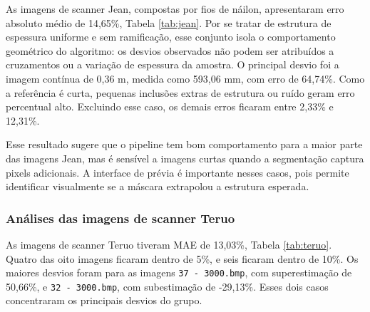 \documentclass[12pt]{article}
\begin{document}
As imagens de scanner Jean, compostas por fios de náilon, apresentaram erro absoluto médio de 14,65\%, Tabela \ref{tab:jean}. Por se tratar de estrutura de espessura uniforme e sem ramificação, esse conjunto isola o comportamento geométrico do algoritmo: os desvios observados não podem ser atribuídos a cruzamentos ou a variação de espessura da amostra. O principal desvio foi a imagem contínua de 0,36 m, medida como 593,06 mm, com erro de 64,74\%. Como a referência é curta, pequenas inclusões extras de estrutura ou ruído geram erro percentual alto. Excluindo esse caso, os demais erros ficaram entre 2,33\% e 12,31\%.

\begin{table}[!htbp]
\centering
\caption{Resultados das imagens Jean.}
\label{tab:jean}
\end{table}

Esse resultado sugere que o pipeline tem bom comportamento para a maior parte das imagens Jean, mas é sensível a imagens curtas quando a segmentação captura pixels adicionais. A interface de prévia é importante nesses casos, pois permite identificar visualmente se a máscara extrapolou a estrutura esperada.

\subsubsection{Análises das imagens de scanner Teruo}

As imagens de scanner Teruo tiveram MAE de 13,03\%, Tabela \ref{tab:teruo}. Quatro das oito imagens ficaram dentro de 5\%, e seis ficaram dentro de 10\%. Os maiores desvios foram para as imagens  \texttt{37 - 3000.bmp}, com superestimação de 50,66\%, e \texttt{32 - 3000.bmp}, com subestimação de -29,13\%. Esses dois casos concentraram os principais desvios do grupo.
\end{document}
